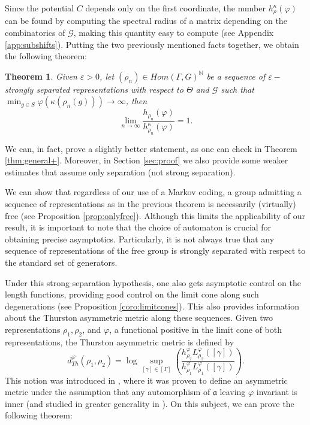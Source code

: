 \documentclass{amsart}
\newtheorem{thm}{Theorem}[section]
\theoremstyle{remark}
\theoremstyle{definition}
\begin{document}
Since the potential $C$ depends only on the first coordinate, the number $h_\rho^\kappa (\varphi)$ can be found by computing the spectral radius of a matrix depending on the combinatorics of $\mathcal{G}$, making this quantity easy to compute (see Appendix \ref{app:subshifts}).
Putting the two previously mentioned facts together, we obtain the following theorem:

\begin{thm}
 Given $\varepsilon>0$, let $(\rho_n) \in Hom (\Gamma,G)^\mathbb{N}$ be a sequence of $\varepsilon-$strongly separated representations with respect to $\Theta$ and $\mathcal{G}$ such that $\min_{g \in S} \varphi (\kappa (\rho_n (g))) \to \infty$, then
    $$\lim_{n \to \infty} \frac{h_{\rho_n} (\varphi)}{h_{\rho_n}^\kappa (\varphi)} = 1.$$
\end{thm}

We can, in fact, prove a slightly better statement, as one can check in Theorem \ref{thm:general+}.
Moreover, in Section \ref{sec:proof} we also provide some weaker estimates that assume only separation (not strong separation).

We can show that regardless of our use of a Markov coding, a group admitting a sequence of representations as in the previous theorem is necessarily (virtually) free (see Proposition \ref{prop:onlyfree}).
Although this limits the applicability of our result, it is important to note that the choice of automaton is crucial for obtaining precise asymptotics.
Particularly, it is not always true that any sequence of representations of the free group is strongly separated with respect to the standard set of generators.

Under this strong separation hypothesis, one also gets asymptotic control on the length functions, providing good control on the limit cone along such degenerations (see Proposition \ref{coro:limitcones}). 
This also provides information about the Thurston asymmetric metric along these sequences.
Given two representations $\rho_1,\rho_2$, and $\varphi$, a functional positive in the limit cone of both representations, the Thurston asymmetric metric is defined by
$$d_{Th}^\varphi (\rho_1,\rho_2) = \log \sup_{[\gamma] \in [\Gamma]} \left( \frac{h_{\rho_2}^\varphi L^\varphi_{\rho_2} ([\gamma])}{h_{\rho_1}^\varphi L^\varphi_{\rho_1} ([\gamma])} \right).$$
This notion was introduced in \cite{carvajales2024thurston}, where it was proven to define an asymmetric metric under the assumption that any automorphism of $\mathfrak{a}$ leaving $\varphi$ invariant is inner (and studied in greater generality in \cite{jyothis2026horoboundary}).
On this subject, we can prove the following theorem:
\end{document}
